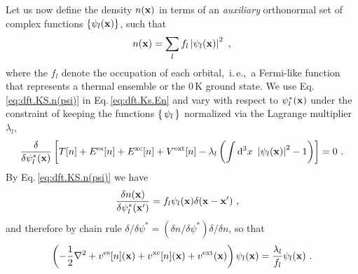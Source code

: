 Let us now define the density $n({\bf x})$ in terms of an \emph{auxiliary} orthonormal set of complex functions $\{ \psi_l ({\bf x}) \}$, such that
\begin{align}
	n({\bf x}) = \sum_l f_l \left\lvert \psi_l ({\bf x}) \right\rvert^2~,
	\label{eq:dft.KS.n(psi)}
\end{align}
where the $f_l$ denote the occupation of each orbital,~i.\,e.,~a Fermi-like function that represents a thermal ensemble or the 0\,K ground state. We use Eq.\,\eqref{eq:dft.KS.n(psi)} in Eq.\,\eqref{eq:dft.Ks.En} and vary with respect to $\psi^\ast_l ({\bf x})$ under the constraint of keeping the functions $\set{\psi_l}$ normalized via the Lagrange multiplier $\lambda_l$,
\begin{align}
	\frac{\delta}{\delta \psi^\ast_l ({\bf x})}
		\left[
			T[n] +  E^{\rm es}[n] + E^{\rm xc} [n] + V^{\rm ext}[n]
			- \lambda_l \left(
				\int \d^3 x ~ \left\lvert \psi_l ({\bf x}) \right\rvert^2 - 1
			\right)
		\right]
		= 0~.
	\label{eq:dft.Ks.variation.1}
\end{align}
By Eq.\,\eqref{eq:dft.KS.n(psi)} we have
\begin{align}
	\frac{\delta n({\bf x})}{\delta \psi^\ast_l ({\bf x}')}
		&= f_l \psi_l ({\bf x}) \delta ({\bf x} - {\bf x}')~,
	\label{eq:dft.KS.dn}
\end{align}
and therefore by chain rule 
$\delta / \delta \psi^\ast = (\delta n / \delta \psi^\ast) \delta / \delta n$, so that
\begin{align}
	\left(
		-\frac{1}{2} \nabla^2 
		+ v^{\rm es} [n] ({\bf x})
		+ v^{\rm xc} [n] ({\bf x})
		+ v^{\rm ext}  ({\bf x})
	\right) \psi_l ({\bf x})
	= \frac{\lambda_l}{f_l} \psi_l ({\bf x})~.
	\label{eq:dft.KS.1}
\end{align}
